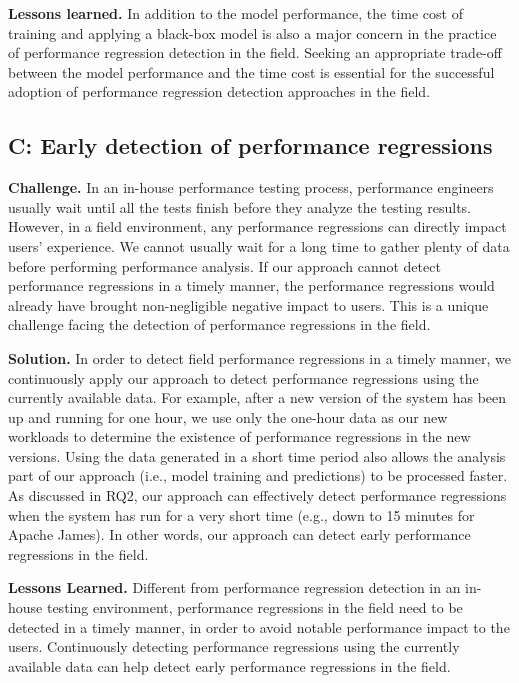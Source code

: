 \noindent\textbf{Lessons learned.}
In addition to the model performance, the time cost of training and applying a black-box model is also a major concern in the practice of performance regression detection in the field.
Seeking an appropriate trade-off between the model performance and the time cost is essential for the successful adoption of performance regression detection approaches in the field.


\subsection*{C: Early detection of performance regressions}
\noindent\textbf{Challenge.}
In an in-house performance testing process, performance engineers usually wait until all the tests finish before they analyze the testing results.
However, in a field environment, any performance regressions can directly impact users' experience.
We cannot usually wait for a long time to gather plenty of data before performing performance analysis.
If our approach cannot detect performance regressions in a timely manner, the performance regressions would already have brought non-negligible negative impact to users.
This is a unique challenge facing the detection of performance regressions in the field.

\noindent\textbf{Solution.}
In order to detect field performance regressions in a timely manner, we continuously apply our approach to detect performance regressions using the currently available data.
For example, after a new version of the system has been up and running for one hour, we use only the one-hour data as our new workloads to determine the existence of performance regressions in the new versions.
Using the data generated in a short time period also allows the analysis part of our approach (i.e., model training and predictions) to be processed faster.
As discussed in RQ2, our approach can effectively detect performance regressions when the system has run for a very short time (e.g., down to 15 minutes for Apache James).
In other words, our approach can detect early performance regressions in the field.

\noindent\textbf{Lessons Learned.}
Different from performance regression detection in an in-house testing environment, performance regressions in the field need to be detected in a timely manner, in order to avoid notable performance impact to the users.
Continuously detecting performance regressions using the currently available data can help detect early performance regressions in the field.
